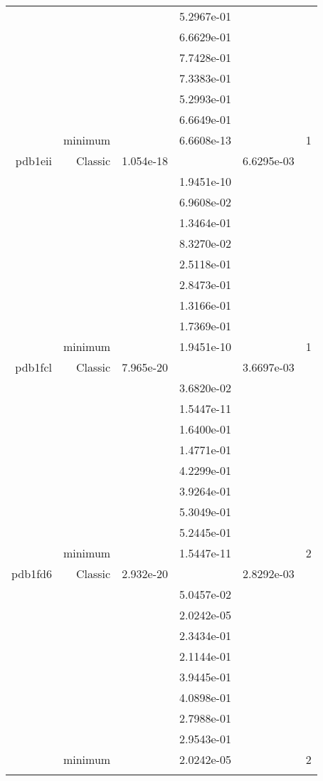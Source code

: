 \begin{xltabular}{\textwidth}{r|rS[table-format=1.3e+2]S[table-format=1.4e+2]S[table-format=1.4e+2]S[table-format=-1.5]}
&  &  & 5.2967e-01 & & \\
&  &  & 6.6629e-01 & & \\
&  &  & 7.7428e-01 & & \\
&  &  & 7.3383e-01 & & \\
&  &  & 5.2993e-01 & & \\
&  &  & 6.6649e-01 & & \\
& minimum &  & 6.6608e-13 & & 1 \\  \addlinespace
pdb1eii & Classic & 1.054e-18 &  & 6.6295e-03 & \\
&  &  & 1.9451e-10 & & \\
&  &  & 6.9608e-02 & & \\
&  &  & 1.3464e-01 & & \\
&  &  & 8.3270e-02 & & \\
&  &  & 2.5118e-01 & & \\
&  &  & 2.8473e-01 & & \\
&  &  & 1.3166e-01 & & \\
&  &  & 1.7369e-01 & & \\
& minimum &  & 1.9451e-10 & & 1 \\  \addlinespace
pdb1fcl & Classic & 7.965e-20 &  & 3.6697e-03 & \\
&  &  & 3.6820e-02 & & \\
&  &  & 1.5447e-11 & & \\
&  &  & 1.6400e-01 & & \\
&  &  & 1.4771e-01 & & \\
&  &  & 4.2299e-01 & & \\
&  &  & 3.9264e-01 & & \\
&  &  & 5.3049e-01 & & \\
&  &  & 5.2445e-01 & & \\
& minimum &  & 1.5447e-11 & & 2 \\  \addlinespace
pdb1fd6 & Classic & 2.932e-20 &  & 2.8292e-03 & \\
&  &  & 5.0457e-02 & & \\
&  &  & 2.0242e-05 & & \\
&  &  & 2.3434e-01 & & \\
&  &  & 2.1144e-01 & & \\
&  &  & 3.9445e-01 & & \\
&  &  & 4.0898e-01 & & \\
&  &  & 2.7988e-01 & & \\
&  &  & 2.9543e-01 & & \\
& minimum &  & 2.0242e-05 & & 2 \\  \addlinespace

\end{xltabular}
